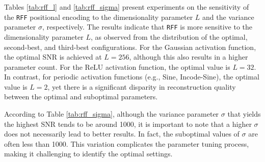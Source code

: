 \documentclass[letterpaper]{article} %
\begin{document}
Tables \ref{tab:rff_l} and \ref{tab:rff_sigma} present experiments on the sensitivity of the \texttt{RFF} positional encoding to the dimensionality parameter \( L \) and the variance parameter \( \sigma \), respectively. The results indicate that \texttt{RFF} is more sensitive to the dimensionality parameter \( L \), as observed from the distribution of the optimal, second-best, and third-best configurations. For the Gaussian activation function, the optimal SNR is achieved at \( L=256 \), although this also results in a higher parameter count. For the ReLU activation function, the optimal value is \( L=32 \). In contrast, for periodic activation functions (e.g., Sine, Incode-Sine), the optimal value is \( L=2 \), yet there is a significant disparity in reconstruction quality between the optimal and suboptimal parameters.

According to Table \ref{tab:rff_sigma}, although the variance parameter \( \sigma \) that yields the highest SNR tends to be around 1000, it is important to note that a higher \( \sigma \) does not necessarily lead to better results. In fact, the suboptimal values of \( \sigma \) are often less than 1000. This variation complicates the parameter tuning process, making it challenging to identify the optimal settings.
\end{document}
